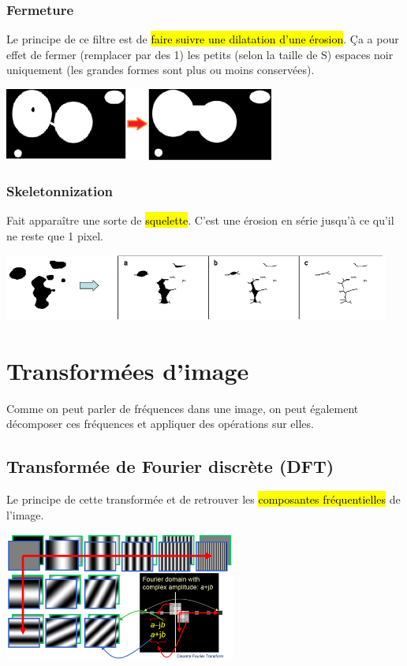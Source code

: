 \documentclass[letterpaper, 12pt]{article}
\newcommand{\alinea}{
\hspace*{0.5cm}}
\begin{document}
		\subsubsection{Fermeture}
			\alinea Le principe de ce filtre est de \hl{faire suivre une dilatation d'une érosion}. Ça a pour effet de fermer 
				(remplacer par des 1) les petits (selon la taille de S) espaces noir uniquement (les grandes formes sont plus ou 
				moins conservées).
			\begin{center}
				\includegraphics[width=3.5in]{Images/closing}
			\end{center}
		\subsubsection{Skeletonnization}
			\alinea Fait apparaître une sorte de \hl{squelette}. C'est une érosion en série jusqu'à ce qu'il ne reste que 1 pixel.
			\begin{center}
				\includegraphics[width=5in]{Images/skeleton}
			\end{center}
%
\section{Transformées d'image}
	\alinea Comme on peut parler de fréquences dans une image, on peut également décomposer ces fréquences et appliquer des opérations
		sur elles.
	\subsection{Transformée de Fourier discrète (DFT)}
		\alinea Le principe de cette transformée et de retrouver les \hl{composantes fréquentielles} de l'image.
		\begin{center}
			\includegraphics[width=3in]{Images/dft}
		\end{center}
\end{document}
